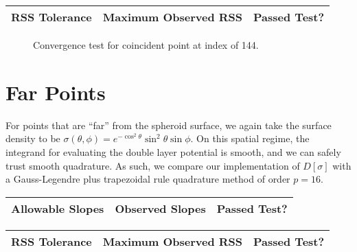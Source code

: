 \documentclass[12pt]{article}
\begin{document}
\begin{center}
\def\arraystretch{1.5}
\begin{tabular}{|c|c|c|} \hline
    RSS Tolerance & Maximum Observed RSS & Passed Test?\\ \hline
    
\end{tabular}
\end{center}

\begin{figure}[!ht]
    \centering
    \caption{Convergence test for coincident point at index \protect of 144.}
\end{figure}

\pagebreak

\section*{Far Points}
For points that are ``far'' from the spheroid surface, we again take the surface density to be $\sigma(\theta,\phi)=e^{-\cos^2\theta} \sin^2\theta \sin\phi$.
On this spatial regime, the integrand for evaluating the double layer potential is smooth, and we can safely trust smooth quadrature. 
As such, we compare our implementation of $D[\sigma]$ with a Gauss-Legendre plus trapezoidal rule quadrature method of order $p=16$.

\begin{center}
\def\arraystretch{1.5}
\begin{tabular}{|c|c|c|} \hline
    Allowable Slopes & Observed Slopes & Passed Test?\\ \hline
    
\end{tabular}
\end{center}

\begin{center}
\def\arraystretch{1.5}
\begin{tabular}{|c|c|c|} \hline
    RSS Tolerance & Maximum Observed RSS & Passed Test?\\ \hline
    
\end{tabular}
\end{center}
\end{document}
